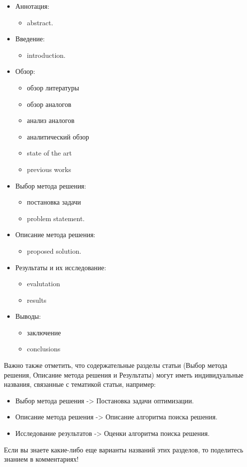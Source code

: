 \documentclass{report}
\begin{document}
\begin{itemize}
	\item Аннотация:
		\begin{itemize}
			\item abstract.
		\end{itemize}
	\item Введение:
		\begin{itemize}
			\item introduction.
		\end{itemize}
	\item Обзор:
		\begin{itemize}
			\item обзор литературы
			\item обзор аналогов
			\item анализ аналогов
			\item аналитический обзор
			\item state of the art
			\item previous works
		\end{itemize}
	\item Выбор метода решения:
		\begin{itemize}
			\item постановка задачи
			\item problem statement.
		\end{itemize}
	\item Описание метода решения:
		\begin{itemize}
			\item proposed solution.
		\end{itemize}
	\item Результаты и их исследование:
		\begin{itemize}
			\item evalutation
			\item results
		\end{itemize}
	\item Выводы:
		\begin{itemize}
			\item заключение
			\item conclusions
		\end{itemize}
\end{itemize}

Важно также отметить, что содержательные разделы статьи (Выбор метода решения, Описание метода решения и Результаты) могут иметь индивидуальные названия, связанные с тематикой статьи, например:

\begin{itemize}
	\item Выбор метода решения -> Постановка задачи оптимизации.
	\item Описание метода решения -> Описание алгоритма поиска решения.
	\item Исследование результатов -> Оценки алгоритма поиска решения.
\end{itemize}
Если вы знаете какие-либо еще варианты названий этих разделов, то поделитесь знанием в комментариях!
\end{document}
